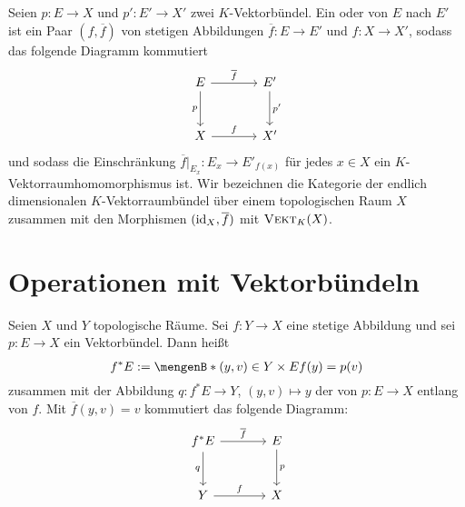 \begin{definition}[{name=[Vektorraumbündelmorphismus]}]
Seien $p \colon E \to X$ und $p' \colon E' \to X'$ zwei $K$-Vektorbündel. Ein  oder 
 von $E$ nach $E'$ ist ein Paar $(f, \overline{f})$ von stetigen Abbildungen $\overline{f} \colon E \to E'$ und $f \colon X \to X'$, sodass 
das folgende Diagramm kommutiert
\[
	\begin{tikzcd}[sep=large]
		E \rar["\overline{f}"] \dar["p"'] & E' \dar["p'"] \\
		X \rar["f"] & X'
	\end{tikzcd}
\]
und sodass die Einschränkung $\overline{f}|_{E_x} \colon E_x \to E'_{f(x)}$ für jedes $x \in X$ ein $K$-Vektorraumhomomorphismus ist. Wir bezeichnen die Kategorie der 
endlich dimensionalen $K$-Vektorraumbündel über einem topologischen Raum $X$ zusammen mit den Morphismen $(\operatorname{id}_X, \overline{f})$ mit $\textsc{Vekt}_K(X)$.	
\end{definition}


\section*{Operationen mit Vektorbündeln}

\begin{definition}[{name=[Pullback eines Vektorbündels]}]
Seien $X$ und $Y$ topologische Räume. Sei $f \colon Y \to X$ eine stetige Abbildung und sei $p \colon E \to X$ ein Vektorbündel. Dann heißt
\[
	f^* E := \set[(y,v) \in Y \times E]{f(y)=p(v)\rule{0cm}{0.9em}} 
\]
zusammen mit der Abbildung $q \colon f^* E \to Y$, $(y,v) \mapsto y$ der  von $p \colon E \to X$ entlang von $f$. Mit $\overline{f}(y,v)=v$ kommutiert das 
folgende Diagramm:
\[
	\begin{tikzcd}[sep=large]
		f^* E \rar["\overline{f}"] \dar["q"'] & E \dar["p"] \\
		Y \rar["f"] & X
	\end{tikzcd}
\]	
\end{definition}



